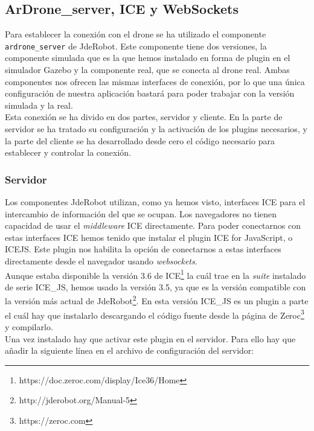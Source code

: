 \subsection{ArDrone\_server, ICE y WebSockets}\label{subsec:ardrone}

Para establecer la conexión con el drone se ha utilizado el componente \texttt{ardrone\_server} de JdeRobot. Este componente tiene dos versiones, la componente simulada que es la que hemos instalado en forma de plugin en el simulador Gazebo y la componente real, que se conecta al drone real. Ambas componentes nos ofrecen las mismas interfaces de conexión, por lo que una única configuración de nuestra aplicación bastará para poder trabajar con la versión simulada y la real.\\

Esta conexión se ha divido en dos partes, servidor y cliente. En la parte de servidor se ha tratado su configuración y la activación de los plugins necesarios, y la parte del cliente se ha desarrollado desde cero el código necesario para establecer y controlar la conexión.\\

\subsubsection{Servidor}

Los componentes JdeRobot utilizan, como ya hemos visto, interfaces ICE para el intercambio de información del que se ocupan. Los navegadores no tienen capacidad de usar el \emph{middleware} ICE directamente. Para poder conectarnos con estas interfaces ICE hemos tenido que instalar el plugin ICE for JavaScript, o ICE\-JS. Este plugin nos habilita la opción de conectarnos a estas interfaces directamente desde el navegador usando \emph{websockets}.\\

Aunque estaba disponible la versión 3.6 de ICE\footnote{https://doc.zeroc.com/display/Ice36/Home} la cuál trae en la \emph{suite} instalado de serie ICE\_JS, hemos usado la versión 3.5, ya que es la versión compatible con la versión más actual de JdeRobot\footnote{http://jderobot.org/Manual-5}. En esta versión ICE\_JS es un plugin a parte el cuál hay que instalarlo descargando el código fuente desde la página de Zeroc\footnote{https://zeroc.com} y compilarlo.\\

Una vez instalado hay que activar este plugin en el servidor. Para ello hay que añadir la siguiente línea en el archivo de configuración del servidor:\\

